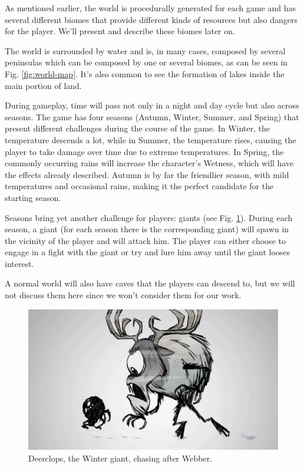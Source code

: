 \noindent As mentioned earlier, the world is procedurally generated for each game and has several different biomes that provide different kinds of resources but also dangers for the player. 
We'll present and describe these biomes later on.

The world is surrounded by water and is, in many cases, composed by several peninsulas which can be composed by one or several biomes, as can be seen in Fig. \ref{fig:world-map}.
It's also common to see the formation of lakes inside the main portion of land.

During gameplay, time will pass not only in a night and day cycle but also across seasons.
The game has four seasons (Autumn, Winter, Summer, and Spring) that present different challenges during the course of the game.
In Winter, the temperature descends a lot, while in Summer, the temperature rises, causing the player to take damage over time due to extreme temperatures.
In Spring, the commonly occurring rains will increase the character's Wetness, which will have the effects already described.
Autumn is by far the friendlier season, with mild temperatures and occasional rains, making it the perfect candidate for the starting season.

Seasons bring yet another challenge for players: giants (see Fig. \ref{fig:dst-deerclops}).
During each season, a giant (for each season there is the corresponding giant) will spawn in the vicinity of the player and will attack him.
The player can either choose to engage in a fight with the giant or try and lure him away until the giant looses interest.

A normal world will also have caves that the players can descend to, but we will not discuss them here since we won't consider them for our work.

\begin{figure}
  \centering
  \includegraphics[width=\textwidth]{./Images/dst-deerclops}
  \caption{Deerclops, the Winter giant, chasing after Webber.}
  \label{fig:dst-deerclops}
\end{figure}

